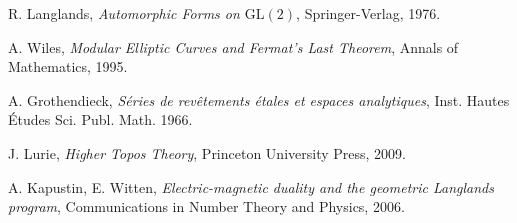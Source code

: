 \documentclass{article}
\theoremstyle{remark}
\begin{document}

\begin{thebibliography}{9}

R. Langlands, \emph{Automorphic Forms on $\text{GL}(2)$}, Springer-Verlag, 1976.

A. Wiles, \emph{Modular Elliptic Curves and Fermat's Last Theorem}, Annals of Mathematics, 1995.

A. Grothendieck, \emph{Séries de revêtements étales et espaces analytiques}, Inst. Hautes Études Sci. Publ. Math. 1966.

J. Lurie, \emph{Higher Topos Theory}, Princeton University Press, 2009.

A. Kapustin, E. Witten, \emph{Electric-magnetic duality and the geometric Langlands program}, Communications in Number Theory and Physics, 2006.

\end{thebibliography}
\end{document}
